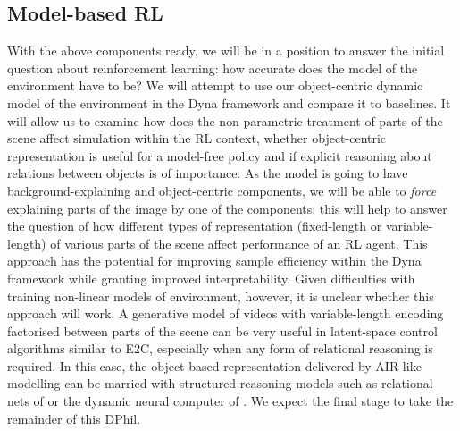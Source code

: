     \subsection{Model-based RL}
        With the above components ready, we will be in a position to answer the initial question about reinforcement learning:
        how accurate does the model of the environment have to be?
        We will attempt to use our object-centric dynamic model of the environment in the Dyna framework and compare it to baselines.
        It will allow us to examine how does the non-parametric treatment of parts of the scene affect simulation within the RL context, whether object-centric representation is useful for a model-free policy and if explicit reasoning about relations between objects is of importance.
        As the model is going to have background-explaining and object-centric components, we will be able to \emph{force} explaining parts of the image by one of the components: this will help to answer the question of how different types of representation (fixed-length or variable-length) of various parts of the scene affect performance of an RL agent.
        This approach has the potential for improving sample efficiency within the Dyna framework while granting improved interpretability. Given difficulties with training non-linear models of environment, however, it is unclear whether this approach will work. A generative model of videos with variable-length encoding factorised between parts of the scene can be very useful in latent-space control algorithms similar to E2C, especially when any form of relational reasoning is required. In this case, the object-based representation delivered by AIR-like modelling can be married with structured reasoning models such as relational nets of \cite{Santoro2017} or the dynamic neural computer of \cite{Graves2016}.
        We expect the final stage to take the remainder of this DPhil.

